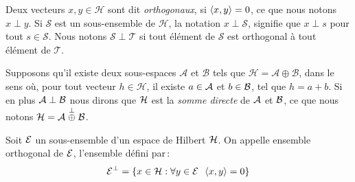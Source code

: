 \begin{definition}[Orthogonalit\'{e}]
Deux vecteurs $x,y \in \mathcal{H}$ sont dit \emph{orthogonaux},
si $\left\langle x, y \right\rangle= 0$, ce que nous notons $x \perp y$. Si $\mathcal{S}$
est un sous-ensemble de $\mathcal{H}$, la notation $x \perp
\mathcal{S}$, signifie que $x \perp s$ pour tout $s \in
\mathcal{S}$. Nous notons $\mathcal{S}\perp\mathcal{T}$ si tout
\'{e}l\'{e}ment de $\mathcal{S}$ est orthogonal \`{a} tout \'{e}l\'{e}ment de
$\mathcal{T}$.
\end{definition}
Supposons qu'il existe deux sous-espaces $\mathcal{A}$ et
$\mathcal{B}$ tels que $\mathcal{H} = \mathcal{A} \oplus \mathcal{B}$,
dans le sens o\`{u}, pour tout vecteur $h \in \mathcal{H}$, il
existe $a \in \mathcal{A}$ et $b \in \mathcal{B}$, tel que $h= a + b$. Si en plus
$\mathcal{A} \perp \mathcal{B}$ nous dirons que $\mathcal{H}$ est la \emph{somme
directe} de $\mathcal{A}$ et $\mathcal{B}$, ce que nous notons $\mathcal{H}= \mathcal{A} \stackrel{\perp}{\oplus}
\mathcal{B}$.
\begin{definition}
Soit ${\cal E}$ un sous-ensemble d'un espace de Hilbert $\cal H$.
On appelle ensemble orthogonal de ${\cal E}$, l'ensemble d\'{e}fini
par\,:
$$
 {\cal E}^{\perp}=\{x\in {\cal H}:
    \forall y\in {\cal E} \hspace{5pt} \left\langle x, y \right\rangle=0\}
$$
\end{definition}

